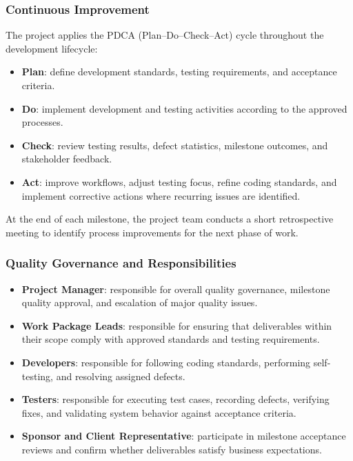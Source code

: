 \documentclass[12pt,a4paper]{article}
\begin{document}
\subsubsection{ Continuous Improvement}

The project applies the PDCA (Plan--Do--Check--Act) cycle throughout the development lifecycle:

\begin{itemize}[leftmargin=*]
    \item \textbf{Plan}: define development standards, testing requirements, and acceptance criteria.
    \item \textbf{Do}: implement development and testing activities according to the approved processes.
    \item \textbf{Check}: review testing results, defect statistics, milestone outcomes, and stakeholder feedback.
    \item \textbf{Act}: improve workflows, adjust testing focus, refine coding standards, and implement corrective actions where recurring issues are identified.
\end{itemize}

At the end of each milestone, the project team conducts a short retrospective meeting to identify process improvements for the next phase of work.

\subsubsection{Quality Governance and Responsibilities}

\begin{itemize}[leftmargin=*]
    \item \textbf{Project Manager}: responsible for overall quality governance, milestone quality approval, and escalation of major quality issues.
    \item \textbf{Work Package Leads}: responsible for ensuring that deliverables within their scope comply with approved standards and testing requirements.
    \item \textbf{Developers}: responsible for following coding standards, performing self-testing, and resolving assigned defects.
    \item \textbf{Testers}: responsible for executing test cases, recording defects, verifying fixes, and validating system behavior against acceptance criteria.
    \item \textbf{Sponsor and Client Representative}: participate in milestone acceptance reviews and confirm whether deliverables satisfy business expectations.
\end{itemize}
\end{document}
